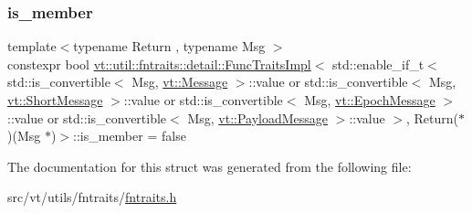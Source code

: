 \subsubsection{\texorpdfstring{is\+\_\+member}{is\_member}}
{\footnotesize\ttfamily template$<$typename Return , typename Msg $>$ \\
constexpr bool \hyperlink{structvt_1_1util_1_1fntraits_1_1detail_1_1_func_traits_impl}{vt\+::util\+::fntraits\+::detail\+::\+Func\+Traits\+Impl}$<$ std\+::enable\+\_\+if\+\_\+t$<$ std\+::is\+\_\+convertible$<$ Msg, \hyperlink{namespacevt_a3a3ddfef40b4c90915fa43cdd5f129ea}{vt\+::\+Message} $>$\+::value or std\+::is\+\_\+convertible$<$ Msg, \hyperlink{namespacevt_a1125ac1da6c0bbf141e0ea0739d7602d}{vt\+::\+Short\+Message} $>$\+::value or std\+::is\+\_\+convertible$<$ Msg, \hyperlink{namespacevt_ad67368ffae52d7325002586b41bb150e}{vt\+::\+Epoch\+Message} $>$\+::value or std\+::is\+\_\+convertible$<$ Msg, \hyperlink{namespacevt_a89a92229c5622b855c02c549f83a1a68}{vt\+::\+Payload\+Message} $>$\+::value $>$, Return($\ast$)(Msg $\ast$)$>$\+::is\+\_\+member = false\hspace{0.3cm}{\ttfamily [static]}}



The documentation for this struct was generated from the following file\+:\begin{DoxyCompactItemize}
\item 
src/vt/utils/fntraits/\hyperlink{fntraits_8h}{fntraits.\+h}\end{DoxyCompactItemize}
